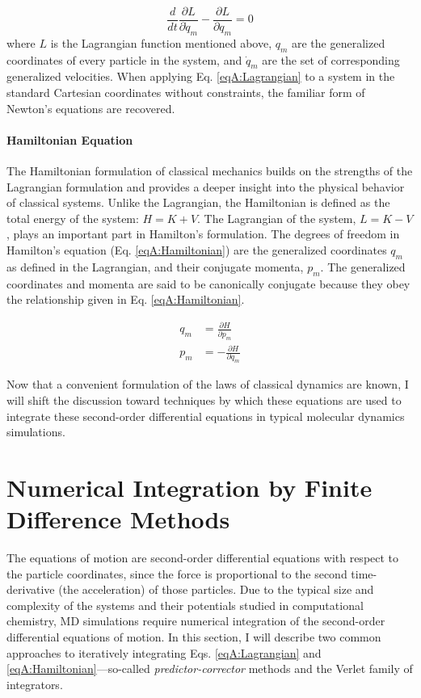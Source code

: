 \begin{equation}
   \frac d {dt} \frac {\partial L} {\partial \dot q_m} - \frac {\partial L}
         {\partial q_m} = 0
   \label{eqA:Lagrangian}
\end{equation}
where $L$ is the Lagrangian function mentioned above, $q_m$ are the generalized
coordinates of every particle in the system, and $\dot q_m$ are the set of
corresponding generalized velocities. When applying Eq. \ref{eqA:Lagrangian} to
a system in the standard Cartesian coordinates without constraints, the familiar
form of Newton's equations are recovered. \cite{CorbenClassicalMechanics}

\paragraph{Hamiltonian Equation}

The Hamiltonian formulation of classical mechanics builds on the strengths of
the Lagrangian formulation and provides a deeper insight into the physical
behavior of classical systems. Unlike the Lagrangian, the Hamiltonian is defined
as the total energy of the system: $H = K + V$. The Lagrangian of the system,
$L = K - V$, plays an important part in Hamilton's formulation. The degrees of
freedom in Hamilton's equation (Eq. \ref{eqA:Hamiltonian}) are the generalized
coordinates $q_m$ as defined in the Lagrangian, and their conjugate momenta,
$p_m$. The generalized coordinates and momenta are said to be canonically
conjugate because they obey the relationship given in Eq. \ref{eqA:Hamiltonian}.
\cite{CorbenClassicalMechanics}

\begin{align}
   q_m & = \frac {\partial H} {\partial p_m} \nonumber \\
   p_m & = - \frac {\partial H} {\partial q_m}
   \label{eqA:Hamiltonian}
\end{align}

Now that a convenient formulation of the laws of classical dynamics are known, I
will shift the discussion toward techniques by which these equations are used to
integrate these second-order differential equations in typical molecular
dynamics simulations.

\section{Numerical Integration by Finite Difference Methods}

The equations of motion are second-order differential equations with respect to
the particle coordinates, since the force is proportional to the second
time-derivative (\ie the acceleration) of those particles. Due to the typical
size and complexity of the systems and their potentials studied in computational
chemistry, MD simulations require numerical integration of the second-order
differential equations of motion. In this section, I will describe two common
approaches to iteratively integrating Eqs. \ref{eqA:Lagrangian} and
\ref{eqA:Hamiltonian}---so-called \emph{predictor-corrector} methods and the
Verlet family of integrators.

